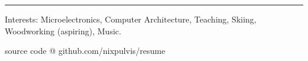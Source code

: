 \documentclass[10pt,letterpaper]{article}
\newenvironment{indentsection}[1]
{\begin{list}{}
  {\setlength{\leftmargin}{#1}} \item[]
}
{\end{list}}
\begin{document}
\hfill \break
\hfill \break
\hfill \break
\hfill \break


\hrule
\begin{indentsection}{\parindent}
\begin{description*}
\item[Interests:]
  Microelectronics, Computer Architecture, Teaching, Skiing, Woodworking
  (aspiring), Music.
\end{description*}
\end{indentsection}


\begin{center}
\footnotesize source code @ github.com/nixpulvis/resume
\end{center}
\end{document}
